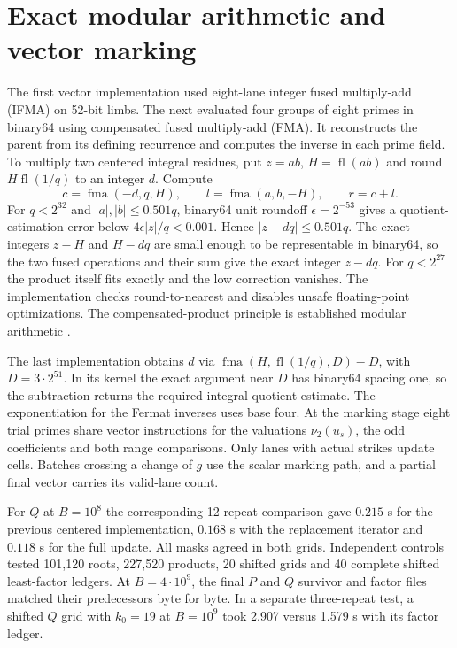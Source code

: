 \documentclass[11pt,a4paper,oneside,openany]{report}
\begin{document}
\section{Exact modular arithmetic and vector marking}
The first vector implementation used eight-lane integer fused multiply-add (IFMA) on 52-bit limbs. The next evaluated four groups of eight primes in binary64 using compensated fused multiply-add (FMA). It reconstructs the parent from its defining recurrence and computes the inverse in each prime field. To multiply two centered integral residues, put $z=ab$, $H=\operatorname{fl}(ab)$ and round $H\operatorname{fl}(1/q)$ to an integer $d$. Compute
\[
   c=\operatorname{fma}(-d,q,H),\qquad
   l=\operatorname{fma}(a,b,-H),\qquad r=c+l .
\]
For $q<2^{32}$ and $|a|,|b|\le0.501q$, binary64 unit roundoff $\epsilon=2^{-53}$ gives a quotient-estimation error below $4\epsilon |z|/q<0.001$. Hence $|z-dq|\le0.501q$. The exact integers $z-H$ and $H-dq$ are small enough to be representable in binary64, so the two fused operations and their sum give the exact integer $z-dq$. For $q<2^{27}$ the product itself fits exactly and the low correction vanishes. The implementation checks round-to-nearest and disables unsafe floating-point optimizations. The compensated-product principle is established modular arithmetic \cite{simd}.

The last implementation obtains $d$ via $\operatorname{fma}(H,\operatorname{fl}(1/q),D)-D$, with $D=3\cdot2^{51}$. In its kernel the exact argument near $D$ has binary64 spacing one, so the subtraction returns the required integral quotient estimate. The exponentiation for the Fermat inverses uses base four. At the marking stage eight trial primes share vector instructions for the valuations $\nu_2(u_s)$, the odd coefficients and both range comparisons. Only lanes with actual strikes update cells. Batches crossing a change of $g$ use the scalar marking path, and a partial final vector carries its valid-lane count.

For $Q$ at $B=10^8$ the corresponding 12-repeat comparison gave $0.215$ s for the previous centered implementation, $0.168$ s with the replacement iterator and $0.118$ s for the full update. All masks agreed in both grids. Independent controls tested 101,120 roots, 227,520 products, 20 shifted grids and 40 complete shifted least-factor ledgers. At $B=4\cdot10^9$, the final $P$ and $Q$ survivor and factor files matched their predecessors byte for byte. In a separate three-repeat test, a shifted $Q$ grid with $k_0=19$ at $B=10^9$ took 2.907 versus 1.579 s with its factor ledger.
\end{document}
